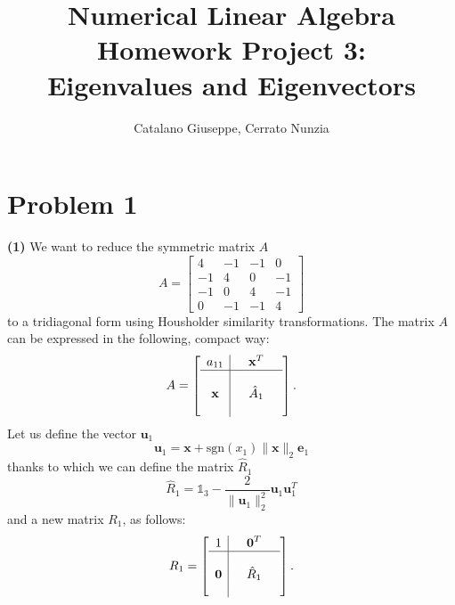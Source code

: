 \documentclass[a4paper,11pt]{article}
\begin{document}
	\author{Catalano Giuseppe, Cerrato Nunzia}
	\title{Numerical Linear Algebra Homework Project 3:\\Eigenvalues and Eigenvectors}
	\date{}
	\maketitle
	
\section*{Problem 1}
\textbf{(1)}
We want to reduce the symmetric matrix $A$
\begin{equation}\label{key}
	A = \begin{bmatrix}
		4 & -1 & -1 & 0 \\
		-1 & 4 & 0 & -1 \\
		-1 & 0 & 4 & -1 \\
		0 & -1 & -1 & 4
	\end{bmatrix} 
\end{equation}
to a tridiagonal form using Housholder similarity transformations. The matrix $A$ can be expressed in the following, compact way:
\begin{equation}
	A =  \left[ 
\begin{array}{c|ccc}
	a_{11}&  & \textbf{x}^T  &  \\
	\hline
	&  &  &  \\
	\textbf{x}&  & \hat{A}_1 &  \\
	&  &  & 
\end{array}\right] .
\end{equation}
Let us define the vector $\textbf{u}_{1}$
\begin{equation}\label{key}
	\textbf{u}_1 = \textbf{x} + \text{sgn}(x_1) \lVert \textbf{x}\rVert_2 \textbf{e}_1
\end{equation}	
thanks to which we can define the matrix $\hat{R}_1$
\begin{equation}\label{key}
	\hat{R}_1 = \mathbb{1}_3 - \frac{2}{\lVert \textbf{u}_1\rVert_2^2} \textbf{u}_1 \textbf{u}_1^T
\end{equation}
and a new matrix $R_1$, as follows:
\begin{equation}\label{key}
	R_1 = \left[ 
	\begin{array}{c|ccc}
		1 &  & \textbf{0}^T  &  \\
		\hline
		&  &  &  \\
		\textbf{0}&  & \hat{R}_1 &  \\
		&  &  & 
	\end{array}\right] .
\end{equation}
\end{document}
